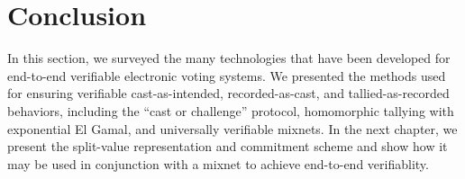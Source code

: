 \section{Conclusion} \label{evote:conclusion}

In this section, we surveyed the many technologies that have been developed for end-to-end verifiable electronic voting systems. We presented the methods used for ensuring verifiable cast-as-intended, recorded-as-cast, and tallied-as-recorded behaviors, including the ``cast or challenge'' protocol, homomorphic tallying with exponential El Gamal, and universally verifiable mixnets. In the next chapter, we present the split-value representation and commitment scheme and show how it may be used in conjunction with a mixnet to achieve end-to-end verifiablity.






